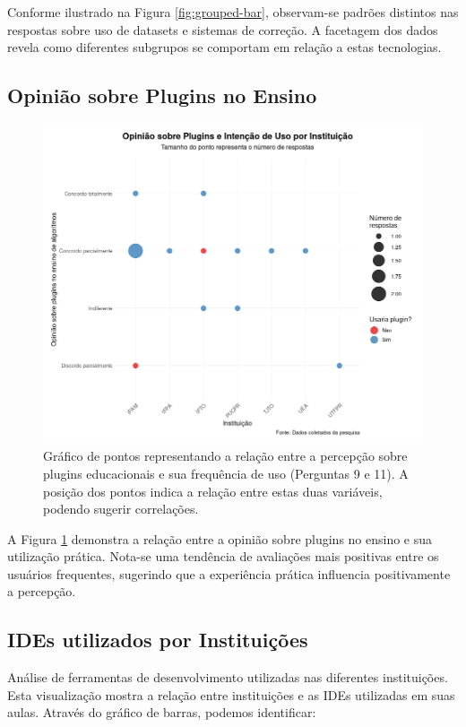 Conforme ilustrado na Figura \ref{fig:grouped-bar}, observam-se padrões distintos nas respostas sobre uso de datasets e sistemas de correção. A facetagem dos dados revela como diferentes subgrupos se comportam em relação a estas tecnologias.

\subsection{Opinião sobre Plugins no Ensino}
\begin{figure}[H]
    \centering
    \includegraphics[width=1\linewidth]{../figuras/plugins-no-ensino-opiniao.png}
    \caption{Gráfico de pontos representando a relação entre a percepção sobre plugins educacionais e sua frequência de uso (Perguntas 9 e 11). A posição dos pontos indica a relação entre estas duas variáveis, podendo sugerir correlações.}
    \label{fig:dot-plot}
\end{figure}

A Figura \ref{fig:dot-plot} demonstra a relação entre a opinião sobre plugins no ensino e sua utilização prática. Nota-se uma tendência de avaliações mais positivas entre os usuários frequentes, sugerindo que a experiência prática influencia positivamente a percepção.

\subsection{IDEs utilizados por Instituições}
Análise de ferramentas de desenvolvimento utilizadas nas diferentes instituições. Esta visualização mostra a relação entre instituições e as IDEs utilizadas em suas aulas. Através do gráfico de barras, podemos identificar:

